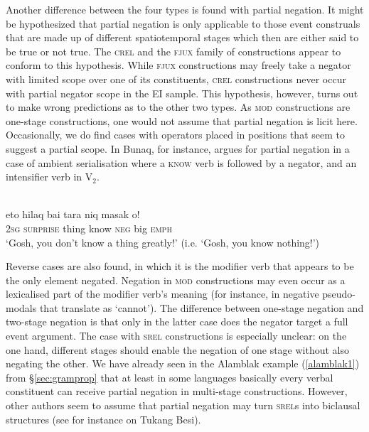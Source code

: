 Another difference between the four types is found with partial negation. It might be hypothesized that partial negation is only applicable to those event construals that are made up of different spatiotemporal stages which then are either said to be true or not true. The \textsc{crel} and the \textsc{fjux} family of constructions appear to conform to this hypothesis. While \textsc{fjux} constructions may freely take a negator with limited scope over one of its constituents, \textsc{crel} constructions never occur with partial negator scope in the EI sample. This hypothesis, however, turns out to make wrong predictions as to the other two types. As \textsc{mod} constructions are one-stage constructions, one would not assume that partial negation is licit here. Occasionally, we do find cases with operators placed in positions that seem to suggest a partial scope. In Bunaq, for instance, \citet[451]{schapper2009bunaq} argues for partial negation in a case of ambient serialisation where a \textsc{know} verb is followed by a negator, and an intensifier verb in V$_2$.

\ea \label{}
\\
\gll eto hilaq bai tara niq masak o! \\
2\textsc{sg} \textsc{surprise} thing know \textsc{neg} big \textsc{emph} \\
\glft `Gosh, you don’t know a thing greatly!' (i.e. `Gosh, you know nothing!')\\ 
\z

Reverse cases are also found, in which it is the modifier verb that appears to be the only element negated. Negation in \textsc{mod} constructions may even occur as a lexicalised part of the modifier verb's meaning (for instance, in negative pseudo-modals that translate as `cannot'). The difference between one-stage negation and two-stage negation is that only in the latter case does the negator target a full event argument. The case with \textsc{srel} constructions is especially unclear: on the one hand, different stages should enable the negation of one stage without also negating the other. We have already seen in the Alamblak example (\ref{alamblak1}) from §\ref{sec:gramprop} that at least in some languages basically every verbal constituent can receive partial negation in multi-stage constructions. However, other authors seem to assume that partial negation may turn \textsc{srel}s into biclausal structures (see for instance \citealt[184]{donohue1999} on Tukang Besi). 

